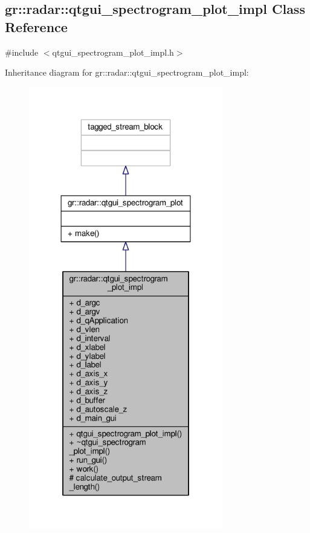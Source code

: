 \subsection{gr\+:\+:radar\+:\+:qtgui\+\_\+spectrogram\+\_\+plot\+\_\+impl Class Reference}
\label{classgr_1_1radar_1_1qtgui__spectrogram__plot__impl}


{\ttfamily \#include $<$qtgui\+\_\+spectrogram\+\_\+plot\+\_\+impl.\+h$>$}



Inheritance diagram for gr\+:\+:radar\+:\+:qtgui\+\_\+spectrogram\+\_\+plot\+\_\+impl\+:
\nopagebreak
\begin{figure}[H]
\begin{center}
\leavevmode
\includegraphics[width=240pt]{d8/d24/classgr_1_1radar_1_1qtgui__spectrogram__plot__impl__inherit__graph}
\end{center}
\end{figure}


